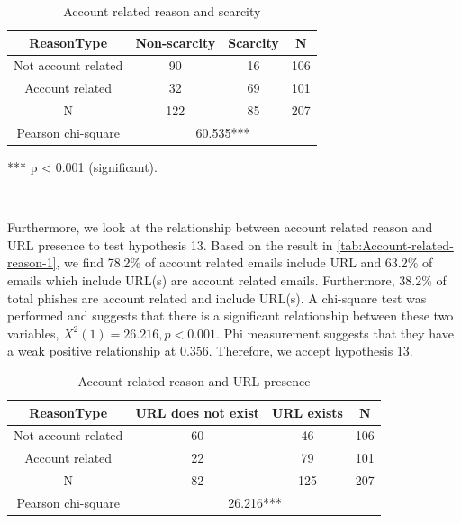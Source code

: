 \begin{minipage}[t]{1\columnwidth}%
\begin{longtable}{cccc}
\caption{\label{tab:Account-related-reason}Account related reason and scarcity}
\tabularnewline
\toprule 
{\footnotesize{}ReasonType} & {\footnotesize{}Non-scarcity} & {\footnotesize{}Scarcity} & \multirow{1}{*}{{\footnotesize{}N}}\tabularnewline
\midrule 
\multirow{1}{*}{{\footnotesize{}Not account related}} & {\footnotesize{}90} & {\footnotesize{}16} & \multirow{1}{*}{{\footnotesize{}106}}\tabularnewline
\midrule 
\multirow{1}{*}{{\footnotesize{}Account related}} & {\footnotesize{}32} & {\footnotesize{}69} & \multirow{1}{*}{{\footnotesize{}101}}\tabularnewline
\midrule
\midrule 
{\footnotesize{}N} & {\footnotesize{}122} & {\footnotesize{}85} & {\footnotesize{}207}\tabularnewline
\midrule
\midrule 
{\footnotesize{}Pearson chi-square} & \multicolumn{3}{c}{{\footnotesize{}60.535{*}{*}{*}}}\tabularnewline
\midrule
\end{longtable}%
\end{minipage}

{*}{*}{*} p < 0.001 (significant).

\ 

Furthermore, we look at the relationship between account related reason
and URL presence to test hypothesis 13. Based on the result in \autoref{tab:Account-related-reason-1},
we find 78.2\% of account related emails include URL and 63.2\% of
emails which include URL(s) are account related emails. Furthermore,
38.2\% of total phishes are account related and include URL(s). A
chi-square test was performed and suggests that there is a significant
relationship between these two variables, $X^{2}(1)=26.216,p<0.001$.
Phi measurement suggests that they have a weak positive relationship
at 0.356. Therefore, we accept hypothesis 13.

\begin{minipage}[t]{1\columnwidth}%
\begin{longtable}{cccc}
\caption{\label{tab:Account-related-reason-1}Account related reason and URL
presence}
\tabularnewline
\toprule 
{\footnotesize{}ReasonType} & {\footnotesize{}URL does not exist} & {\footnotesize{}URL exists} & \multirow{1}{*}{{\footnotesize{}N}}\tabularnewline
\midrule 
\multirow{1}{*}{{\footnotesize{}Not account related}} & {\footnotesize{}60} & {\footnotesize{}46} & \multirow{1}{*}{{\footnotesize{}106}}\tabularnewline
\midrule 
\multirow{1}{*}{{\footnotesize{}Account related}} & {\footnotesize{}22} & {\footnotesize{}79} & \multirow{1}{*}{{\footnotesize{}101}}\tabularnewline
\midrule
\midrule 
{\footnotesize{}N} & {\footnotesize{}82} & {\footnotesize{}125} & {\footnotesize{}207}\tabularnewline
\midrule
\midrule 
{\footnotesize{}Pearson chi-square} & \multicolumn{3}{c}{{\footnotesize{}26.216{*}{*}{*}}}\tabularnewline
\midrule
\end{longtable}%
\end{minipage}

